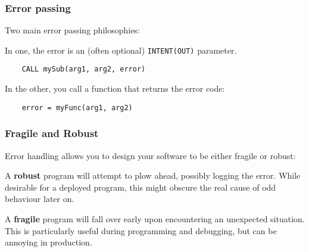 \begin{frame}[fragile]
    \frametitle{Error passing}
    Two main error passing philosophies:

    In one, the error is an (often optional) \texttt{INTENT(OUT)} parameter. 
    \begin{lstlisting}
    CALL mySub(arg1, arg2, error)
    \end{lstlisting}

    In the other, you call a function that returns the error code:
    \begin{lstlisting}
    error = myFunc(arg1, arg2)
    \end{lstlisting}

\end{frame}

\begin{frame}
    \frametitle{Fragile and Robust}
    Error handling allows you to design your software to be either fragile or robust:

    A \textbf{robust} program will attempt to plow ahead, possibly logging the error. 
    While desirable for a deployed program, this might obscure the real cause of odd behaviour later on.

    A \textbf{fragile} program will fall over early upon encountering an unexpected situation. 
    This is particularly useful during programming and debugging, but can be annoying in production.
\end{frame}
